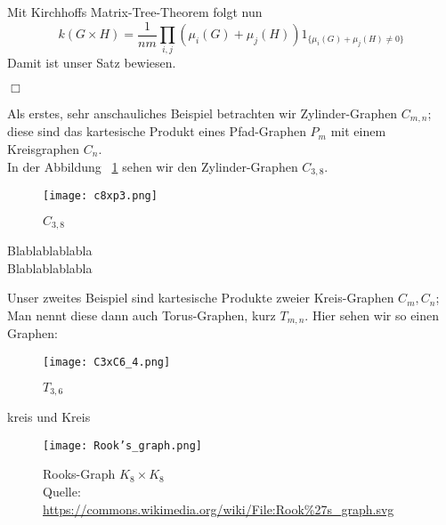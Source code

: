 Mit Kirchhoffs Matrix-Tree-Theorem folgt nun
\begin{equation}
 \mathit{k}(G \times H) = \frac{1}{nm}\displaystyle\prod_{i,j}(\mu_i(G)+\mu_j(H))1_{\{\mu_i(G)+\mu_j(H)\neq0\}}
\end{equation}
Damit ist unser Satz bewiesen.
\begin{flushright} $\Box$ \end{flushright} 
Als erstes, sehr anschauliches Beispiel betrachten wir Zylinder-Graphen $C_{m,n}$;
diese sind das kartesische Produkt eines Pfad-Graphen $P_m$ mit einem Kreisgraphen $C_n$.\\
In der Abbildung ~\ref{c8xp3} sehen wir den Zylinder-Graphen $C_{3,8}$.
\begin{figure}[H]
  \centering
 \texttt{[image: c8xp3.png]}
 \caption{$C_{3,8}$}
 \label{c8xp3} %
\end{figure}
\begin{Bsps}
Blablablablabla\\
Blablablablabla
\end{Bsps}
Unser zweites Beispiel sind kartesische Produkte zweier Kreis-Graphen $C_m,C_n$; Man nennt diese dann auch Torus-Graphen, kurz $T_{m,n}$. Hier sehen wir so einen Graphen:
\begin{figure}[H]
  \centering
 \texttt{[image: C3xC6\_4.png]}
 \caption{$T_{3,6}$}
 \label{c3xc6} %
\end{figure}
\begin{Bsps}
kreis und Kreis
\end{Bsps}
\begin{figure}[H]
  \centering
 \texttt{[image: Rook's\_graph.png]}
 \caption*{Rooks-Graph $K_8\times K_8$ \\ \tiny{Quelle: \url{https://commons.wikimedia.org/wiki/File:Rook\%27s_graph.svg}}}
 \label{rook} %
\end{figure}
\begin{Bsps}
\end{Bsps}

